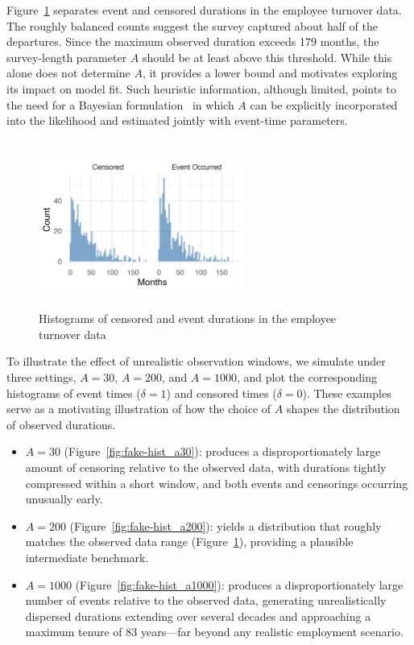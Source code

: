 \begin{example}
Figure~\ref{fig:离职数据分开的直方图} separates event and censored durations in the employee turnover data. The roughly balanced counts suggest the survey captured about half of the departures. Since the maximum observed duration exceeds 179 months, the survey-length parameter $A$ should be at least above this threshold. While this alone does not determine $A$, it provides a lower bound and motivates exploring its impact on model fit. Such heuristic information, although limited, points to the need for a Bayesian formulation~\cite{bartovs2022informed} in which $A$ can be explicitly incorporated into the likelihood and estimated jointly with event-time parameters. 
\begin{figure}[H]
    \centering
    \includegraphics[height=5.5cm, width=0.6\textwidth]{images/separate_hist.png}
    \caption{{\small Histograms of censored and event durations in the employee turnover data}}
    \label{fig:离职数据分开的直方图}
\end{figure}
To illustrate the effect of unrealistic observation windows, we simulate under three settings, $A = 30$, $A = 200$, and $A = 1000$, and plot the corresponding histograms of event times ($\delta = 1$) and censored times ($\delta = 0$). These examples serve as a motivating illustration of how the choice of $A$ shapes the distribution of observed durations.
\begin{itemize}
    \item $A = 30$ (Figure~\ref{fig:fake-hist_a30}): produces a disproportionately large amount of censoring relative to the observed data, with durations tightly compressed within a short window, and both events and censorings occurring unusually early.
    \item $A = 200$ (Figure~\ref{fig:fake-hist_a200}): yields a distribution that roughly matches the observed data range 
    (Figure~\ref{fig:离职数据分开的直方图}), providing a plausible intermediate benchmark.
    \item $A = 1000$ (Figure~\ref{fig:fake-hist_a1000}): produces a disproportionately large number of events relative to the observed data, generating unrealistically dispersed durations extending over several decades and approaching a maximum tenure of 83 years—far beyond any realistic employment scenario.

\end{itemize}
\end{example}
